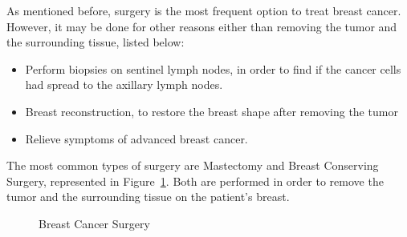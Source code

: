 As mentioned before, surgery is the most frequent option to treat breast cancer. However, it may be done for other reasons either than removing the tumor and the surrounding tissue, listed below:

\begin{itemize}
\item Perform biopsies on sentinel lymph nodes, in order to find if the cancer cells had spread to the axillary lymph nodes.
\item Breast reconstruction, to restore the breast shape after removing the tumor
\item Relieve symptoms of advanced breast cancer.
\end{itemize}

The most common types of surgery are Mastectomy and Breast Conserving Surgery, represented in Figure~\ref{fig:Breast Cancer Surgery}. Both are performed in order to remove the tumor and the surrounding tissue on the patient's breast.

\begin{figure}[H]
    \centering
    \qquad \qquad \qquad
    \caption[Breast Cancer Surgery]{Breast Cancer Surgery \protect\footnotemark}
    \label{fig:Breast Cancer Surgery}
\end{figure}

